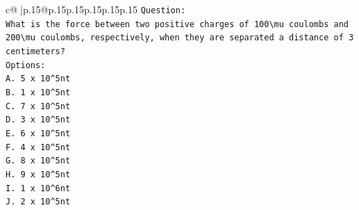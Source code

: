\documentclass{article}
\begin{document}
{\begin{supertabular}{c@{$\;$}|p{.15\linewidth}@{}p{.15\linewidth}p{.15\linewidth}p{.15\linewidth}p{.15\linewidth}p{.15\linewidth}}
{{{\texttt{Question:} \\
\texttt{What is the force between two positive charges of 100\textbackslash{}mu coulombs and 200\textbackslash{}mu coulombs, respectively, when they are separated a distance of 3 centimeters?} \\
\texttt{Options:} \\
\texttt{A. 5 x 10\^{}5nt} \\
\texttt{B. 1 x 10\^{}5nt} \\
\texttt{C. 7 x 10\^{}5nt} \\
\texttt{D. 3 x 10\^{}5nt} \\
\texttt{E. 6 x 10\^{}5nt} \\
\texttt{F. 4 x 10\^{}5nt} \\
\texttt{G. 8 x 10\^{}5nt} \\
\texttt{H. 9 x 10\^{}5nt} \\
\texttt{I. 1 x 10\^{}6nt} \\
\texttt{J. 2 x 10\^{}5nt} \\
            }
        }
    }
     \\ \\


\end{supertabular}}
\end{document}
